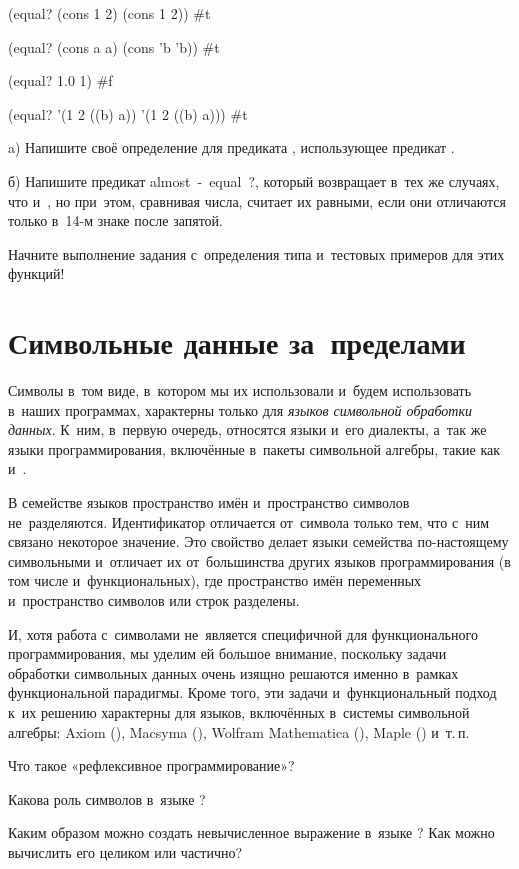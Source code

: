 \REPL
  {(equal? (cons 1 2) (cons 1 2))}
  {\#t}

\REPL
  {(equal? (cons a a) (cons 'b 'b))}
  {\#t}

\REPL
  {(equal? 1.0 1)}
  {\#f}

\REPL
  {(equal? '(1 2 ((b) a)) '(1 2 ((b) a)))}
  {\#t} 

\begin{Assignment}

a) Напишите своё определение для предиката , использующее предикат .

б) Напишите предикат \si{almost-equal?}, который возвращает  в~тех же случаях, что и~, но при~этом, сравнивая числа, считает их равными, если они отличаются только в~14-м знаке после запятой.

\begin{Tip}
Начните выполнение задания с~определения типа и~тестовых примеров для этих функций!
\end{Tip}

\end{Assignment}

\section{Символьные данные за~пределами~\Scheme}%
Символы в~том виде, в~котором мы их использовали и~будем использовать в~наших программах, характерны только для \emph{языков символьной обработки данных}. К~ним, в~первую очередь, относятся языки  \Lisp и~его диалекты, а~так же языки программирования, включённые в~пакеты символьной алгебры, такие как  и~.

В семействе языков \Lisp пространство имён и~пространство символов не~разделяются. Идентификатор отличается от~символа только тем, что с~ним связано некоторое значение. Это свойство делает языки семейства \Lisp по-настоящему символьными и~отличает их от~большинства других языков программирования (в том числе и~функциональных), где пространство имён переменных и~пространство символов или строк разделены.

И, хотя работа с~символами не~является специфичной для функционального программирования, мы уделим ей большое внимание, поскольку задачи обработки символьных данных очень изящно решаются именно в~рамках функциональной парадигмы. Кроме того, эти задачи и~функциональный подход к~их решению характерны для языков, включённых в~системы символьной алгебры: Axiom (), Macsyma (\Lisp), Wolfram Mathematica (), Maple () и~т.\,п.

\begin{Queeze}
 \item Что такое «рефлексивное программирование»?

 \item Какова роль символов в~языке \Scheme?

 \item Каким образом можно создать невычисленное выражение в~языке \Scheme? Как можно вычислить его целиком или частично?
\end{Queeze}
